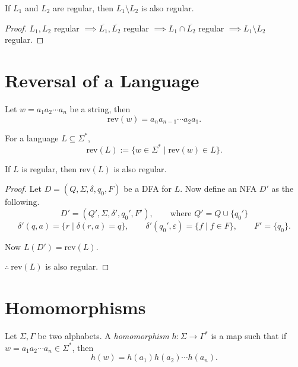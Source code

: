 \begin{blackbox}
\begin{proposition}
If $L_1$ and $L_2$ are regular, then $L_1 \setminus L_2$ is also regular.
\end{proposition}
\end{blackbox}

\begin{proof}
$L_1, L_2$ regular $\implies \overline{L_1}, \overline{L_2}$ regular $\implies L_1 \cap \overline{L_2}$ regular $\implies L_1 \setminus L_2$ regular.
\end{proof}

\section{Reversal of a Language}

Let $w = a_1 a_2 \cdots a_n$ be a string, then
\[
\mathrm{rev}(w) = a_n a_{n-1} \cdots a_2 a_1.
\]

For a language $L \subseteq \Sigma^*$,
\[
\mathrm{rev}(L) := \{ w \in \Sigma^* \mid \mathrm{rev}(w) \in L \}.
\]

\begin{blackbox}
\begin{proposition}
If $L$ is regular, then $\mathrm{rev}(L)$ is also regular.
\end{proposition}
\end{blackbox}

\begin{proof}
Let $D = (Q, \Sigma, \delta, q_0, F)$ be a DFA for $L$. Now define an NFA $D'$ as the following.
\[
D' = (Q', \Sigma, \delta', q_0', F'), \qquad \text{where } Q' = Q \cup \{q_0'\}
\]
\[
\delta'(q, a) = \{ r \mid \delta(r, a) = q \}, \qquad
\delta'(q_0', \varepsilon) = \{ f \mid f \in F \}, \qquad
F' = \{q_0\}.
\]

Now $L(D') = \mathrm{rev}(L)$.

$\therefore\ \mathrm{rev}(L)$ is also regular.
\end{proof}

\section{Homomorphisms}

\begin{greybox}
\begin{definition}[Homomorphism]
Let $\Sigma, \Gamma$ be two alphabets. A \emph{homomorphism} $h : \Sigma \to \Gamma^*$ is a map such that if $w = a_1 a_2 \cdots a_n \in \Sigma^*$, then
\[
h(w) = h(a_1) h(a_2) \cdots h(a_n).
\]
\end{definition}
\end{greybox}

